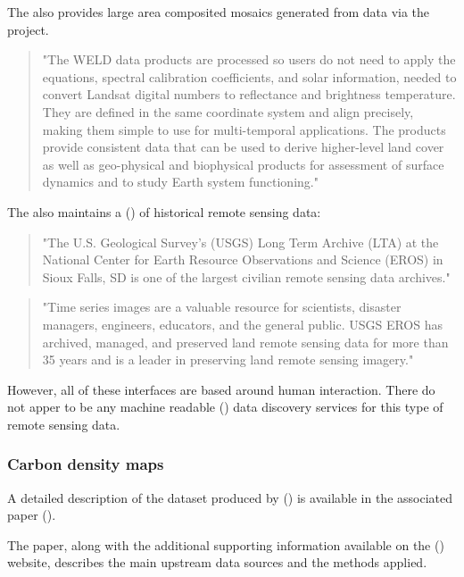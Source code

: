 \documentclass{article}
\begin{document}
The \cite{usgs} also provides large area composited mosaics generated from
\cite{landsat} data via the \cite{weld} project.

\begin{quote}
"The WELD data products are processed so users do not need to apply the
equations, spectral calibration coefficients, and solar information, needed
to convert Landsat digital numbers to reflectance and brightness temperature.
They are defined in the same coordinate system and align precisely, making
them simple to use for multi-temporal applications.
The products provide consistent data that can be used to derive higher-level
land cover as well as geo-physical and biophysical products for assessment
of surface dynamics and to study Earth system functioning."
\end{quote}

The \cite{usgs} also maintains a  (\cite{usgs-lta})
of historical remote sensing data:

\begin{quote}
"The U.S. Geological Survey's (USGS) Long Term Archive (LTA) at the National
Center for Earth Resource Observations and Science (EROS) in Sioux Falls,
SD is one of the largest civilian remote sensing data archives."
\end{quote}

\begin{quote}
"Time series images are a valuable resource for scientists, disaster
managers, engineers, educators, and the general public. USGS EROS has
archived, managed, and preserved land remote sensing data for more than 35
years and is a leader in preserving land remote sensing imagery."
\end{quote}

However, all of these interfaces are based around human interaction. There
do not apper to be any machine readable (\cite{web-service}) data discovery
services for this type of remote sensing data.

\subsubsection{Carbon density maps}

A detailed description of the dataset produced by 
(\cite{nasa-jpl-carbon}) is available in the associated paper
(\cite{saatchi-2011}).

The paper, along with the additional supporting information available on
the  (\cite{pnas}) website, describes the main upstream
data sources and the methods applied.
\end{document}
